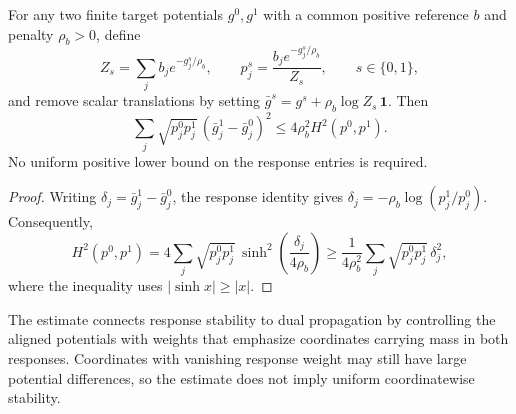 \begin{corollary}
\label{cor:uot-hierarchy-weighted-potentials}
For any two finite target potentials $g^0,g^1$ with a common positive reference $b$ and penalty $\rho_b>0$, define
$$Z_s=\sum_j b_j e^{-g_j^s/\rho_b},\qquad p_j^s=\frac{b_j e^{-g_j^s/\rho_b}}{Z_s},\qquad s\in\{0,1\},$$
and remove scalar translations by setting $\bar g^s=g^s+\rho_b\log Z_s\,\mathbf1$.
Then
\begin{equation*}
\sum_j\sqrt{p_j^0p_j^1}\,(\bar g_j^1-\bar g_j^0)^2\leq4\rho_b^2H^2(p^0,p^1).
\end{equation*}
No uniform positive lower bound on the response entries is required.
\end{corollary}
\begin{proof}
Writing $\delta_j=\bar g_j^1-\bar g_j^0$, the response identity gives $\delta_j=-\rho_b\log(p_j^1/p_j^0)$.
Consequently,
$$H^2(p^0,p^1)=4\sum_j\sqrt{p_j^0p_j^1}\,\sinh^2\!\left(\frac{\delta_j}{4\rho_b}\right)\geq\frac{1}{4\rho_b^2}\sum_j\sqrt{p_j^0p_j^1}\,\delta_j^2,$$
where the inequality uses $|\sinh x|\geq|x|$.
\end{proof}

The estimate connects response stability to dual propagation by controlling the aligned potentials with weights that emphasize coordinates carrying mass in both responses.
Coordinates with vanishing response weight may still have large potential differences, so the estimate does not imply uniform coordinatewise stability.

